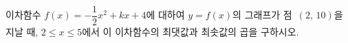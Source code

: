 이차함수 $f(x)=-\dfrac{1}{2}x^2+kx+4$에 대하여 $y=f(x)$의 그래프가 점~$(2,\,10)$을 지날 때, $2\le x\le 5$에서 이 이차함수의 최댓값과 최솟값의 곱을 구하시오. 
